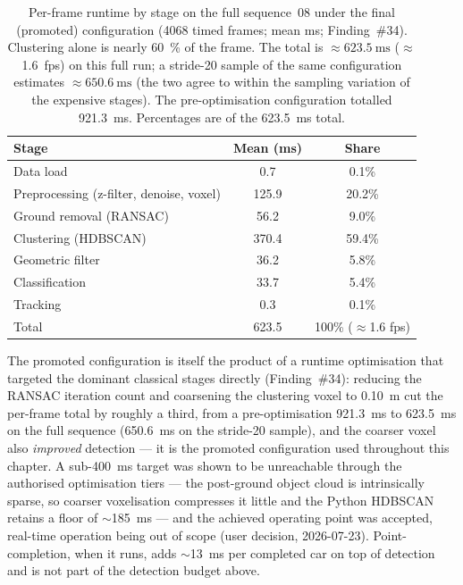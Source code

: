 \begin{table}[H]
  \centering
  \caption{Per-frame runtime by stage on the full sequence~08 under the final
    (promoted) configuration (\num{4068} timed frames; mean ms; Finding~\#34).
    Clustering alone is nearly \SI{60}{\percent} of the frame. The total is
    $\approx\SI{623.5}{\milli\second}$ ($\approx$\num{1.6}~fps) on this full run;
    a stride-20 sample of the same configuration estimates
    $\approx\SI{650.6}{\milli\second}$ (the two agree to within the sampling
    variation of the expensive stages). The pre-optimisation configuration
    totalled \SI{921.3}{\milli\second}. Percentages are of the
    \SI{623.5}{\milli\second} total.}
  \label{tab:runtime}
  \begin{tabular}{lcc}
    \toprule
    Stage & Mean (ms) & Share \\
    \midrule
    Data load                       & 0.7   & 0.1\% \\
    Preprocessing (z-filter, denoise, voxel) & 125.9 & 20.2\% \\
    Ground removal (RANSAC)         & 56.2  & 9.0\% \\
    Clustering (HDBSCAN)            & 370.4 & 59.4\% \\
    Geometric filter                & 36.2  & 5.8\% \\
    Classification                  & 33.7  & 5.4\% \\
    Tracking                        & 0.3   & 0.1\% \\
    \midrule
    Total                           & 623.5 & 100\% ($\approx$1.6 fps) \\
    \bottomrule
  \end{tabular}
\end{table}

The promoted configuration is itself the product of a runtime optimisation that
targeted the dominant classical stages directly (Finding~\#34): reducing the
RANSAC iteration count and coarsening the clustering voxel to \SI{0.10}{\metre}
cut the per-frame total by roughly a third, from a pre-optimisation
\SI{921.3}{\milli\second} to \SI{623.5}{\milli\second} on the full sequence
(\SI{650.6}{\milli\second} on the stride-20 sample), and the coarser voxel also
\emph{improved} detection --- it is the promoted configuration used throughout
this chapter. A sub-\SI{400}{\milli\second} target was shown to be unreachable
through the authorised optimisation tiers --- the post-ground object cloud is
intrinsically sparse, so coarser voxelisation compresses it little and the Python
HDBSCAN retains a floor of $\sim$\SI{185}{\milli\second} --- and the achieved
operating point was accepted, real-time operation being out of scope (user
decision, \num{2026}-07-23). Point-completion, when it runs, adds
$\sim$\SI{13}{\milli\second} per completed car on top of detection and is not part
of the detection budget above.
